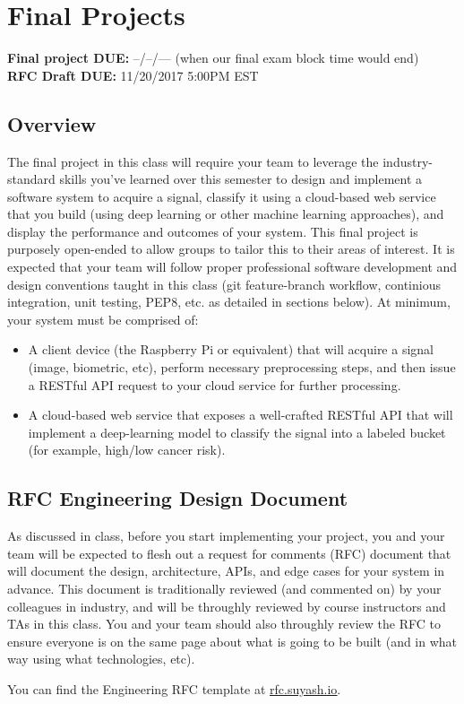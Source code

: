 
\usepackage{hyperref}



\section*{Final Projects}
{\bf Final project DUE:} --/--/--- (when our final exam block time would end) \\
{\bf RFC Draft DUE:} 11/20/2017 5:00PM EST 

\subsection*{Overview}
The final project in this class will require your team to leverage the industry-standard skills you've learned over this semester to design and implement a software system to acquire a signal, classify it using a cloud-based web service that you build (using deep learning or other machine learning approaches), and display the performance and outcomes of your system. This final project is purposely open-ended to allow groups to tailor this to their areas of interest. It is expected that your team will follow proper professional software development and design conventions taught in this class (git feature-branch workflow, continious integration, unit testing, PEP8, etc. as detailed in sections below). At minimum, your system must be comprised of:

\begin{itemize}
	\item A client device (the Raspberry Pi or equivalent) that will acquire a signal (image, biometric, etc), perform necessary preprocessing steps, and then issue a RESTful API request to your cloud service for further processing.
	\item A cloud-based web service that exposes a well-crafted RESTful API that will implement a deep-learning model to classify the signal into a labeled bucket (for example, high/low cancer risk).
\end{itemize}

\subsection*{RFC Engineering Design Document}
As discussed in class, before you start implementing your project, you and your team will be expected to flesh out a request for comments (RFC) document that will document the design, architecture, APIs, and edge cases for your system in advance. This document is traditionally reviewed (and commented on) by your colleagues in industry, and will be throughly reviewed by course instructors and TAs in this class. You and your team should also throughly review the RFC to ensure everyone is on the same page about what is going to be built (and in what way using what technologies, etc). 

You can find the Engineering RFC template at \underline{\href{http://rfc.suyash.io}{rfc.suyash.io}}.



